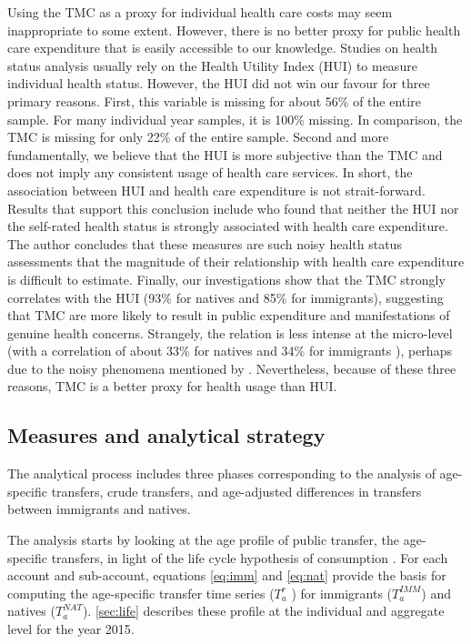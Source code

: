 \vspace{0.7em}\par
Using the TMC as a proxy for individual health care costs may seem inappropriate to some extent.
However, there is no better proxy for public health care expenditure that is easily accessible to our knowledge.
Studies on health status analysis usually rely on the Health Utility Index (HUI) to measure individual health status.
However, the HUI did not win our favour for three primary reasons.
First, this variable is missing for about 56\% of the entire sample.
For many individual year samples, it is 100\% missing.
In comparison, the TMC is missing for only 22\% of the entire sample.
Second and more fundamentally, we believe that the HUI is more subjective than the TMC and does not imply any consistent usage of health care services.
In short, the association between HUI and health care expenditure is not strait-forward. Results that support this conclusion include \citet{Pierard:2016ik} who found that neither the HUI nor the self-rated health status is strongly associated with health care expenditure.
The author concludes that these measures are such noisy health status assessments that the magnitude of their relationship with health care expenditure is difficult to estimate.
Finally, our investigations show that the TMC strongly correlates with the HUI (93\% for natives and 85\% for immigrants), suggesting that TMC are more likely to result in public expenditure and manifestations of genuine health concerns.
Strangely, the relation is less intense at the micro-level (with a correlation of about 33\% for natives and 34\% for immigrants ), perhaps due to the noisy phenomena mentioned by \citet{Pierard:2016ik}.
Nevertheless, because of these three reasons, TMC is a better proxy for health usage than HUI.

\subsection{Measures and analytical strategy}

The analytical process includes three phases corresponding to the analysis of age-specific transfers, crude transfers, and age-adjusted differences in transfers between immigrants and natives.

\vspace{0.7em}\par
The analysis starts by looking at the age profile of public transfer, the age-specific transfers, in light of the life cycle hypothesis of consumption \citep{Ando:1963ea,Deaton:2005vr}.
For each account and sub-account, equations \eqref{eq:imm} and \eqref{eq:nat} provide the basis for computing the age-specific transfer time series (\( T^{r}_a \) ) for immigrants (\(T^{IMM}_a\)) and natives (\( T^{NAT}_a \)). \autoref{sec:life} describes these profile at the individual and aggregate level for the year 2015.

